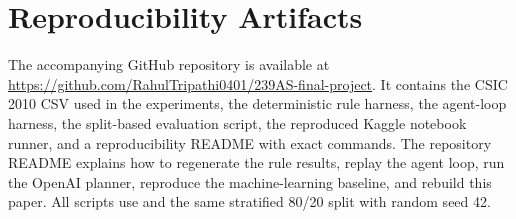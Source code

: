 \documentclass[letterpaper,twocolumn,10pt]{article}
\begin{document}
\section*{Reproducibility Artifacts}

The accompanying GitHub repository is available at \url{https://github.com/RahulTripathi0401/239AS-final-project}. It contains the CSIC 2010 CSV used in the experiments, the deterministic rule harness, the agent-loop harness, the split-based evaluation script, the reproduced Kaggle notebook runner, and a reproducibility README with exact commands. The repository README explains how to regenerate the rule results, replay the agent loop, run the OpenAI planner, reproduce the machine-learning baseline, and rebuild this paper. All scripts use  and the same stratified 80/20 split with random seed 42.

{\footnotesize





}
\end{document}
